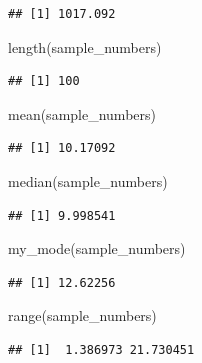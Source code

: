 \documentclass[
]{book}
\newenvironment{Shaded}{\begin{snugshade}}{\end{snugshade}}
\newcommand{\FunctionTok}[1]{\textcolor[rgb]{0.00,0.00,0.00}{#1}}
\newcommand{\NormalTok}[1]{#1}
\begin{document}
\begin{verbatim}
## [1] 1017.092
\end{verbatim}

\begin{Shaded}
\begin{Highlighting}[]
\FunctionTok{length}\NormalTok{(sample\_numbers)}
\end{Highlighting}
\end{Shaded}

\begin{verbatim}
## [1] 100
\end{verbatim}

\begin{Shaded}
\begin{Highlighting}[]
\FunctionTok{mean}\NormalTok{(sample\_numbers)}
\end{Highlighting}
\end{Shaded}

\begin{verbatim}
## [1] 10.17092
\end{verbatim}

\begin{Shaded}
\begin{Highlighting}[]
\FunctionTok{median}\NormalTok{(sample\_numbers)}
\end{Highlighting}
\end{Shaded}

\begin{verbatim}
## [1] 9.998541
\end{verbatim}

\begin{Shaded}
\begin{Highlighting}[]
\FunctionTok{my\_mode}\NormalTok{(sample\_numbers)}
\end{Highlighting}
\end{Shaded}

\begin{verbatim}
## [1] 12.62256
\end{verbatim}

\begin{Shaded}
\begin{Highlighting}[]
\FunctionTok{range}\NormalTok{(sample\_numbers)}
\end{Highlighting}
\end{Shaded}

\begin{verbatim}
## [1]  1.386973 21.730451
\end{verbatim}
\end{document}
